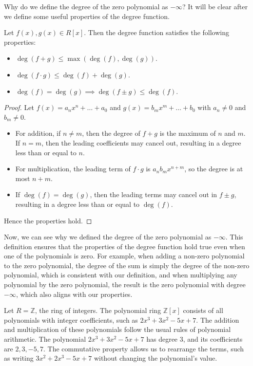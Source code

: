 \documentclass[openany]{book}
\begin{document}
Why do we define the degree of the zero polynomial as $-\infty$? It will be clear after we define some useful properties of the degree function.
\begin{mytheorem}
\cite{2Poly}
Let $f(x), g(x) \in R[x]$. Then the degree function satisfies the following properties:
\begin{itemize}
    \item $\deg(f + g) \leq \max(\deg(f), \deg(g))$.
    \item $\deg(f \cdot g) \leq \deg(f) + \deg(g)$.
    \item $\deg(f) = \deg(g) \implies \deg(f \pm g) \leq \deg(f)$.
\end{itemize}
\end{mytheorem}
\begin{proof}
Let $f(x) = a_n x^n + \ldots + a_0$ and $g(x) = b_m x^m + \ldots + b_0$ with $a_n \neq 0$ and $b_m \neq 0$.
\begin{itemize}
    \item For addition, if $n \neq m$, then the degree of $f + g$ is the maximum of $n$ and $m$. If $n = m$, then the leading coefficients may cancel out, resulting in a degree less than or equal to $n$.
    \item For multiplication, the leading term of $f \cdot g$ is $a_n b_m x^{n+m}$, so the degree is at most $n + m$.
    \item If $\deg(f) = \deg(g)$, then the leading terms may cancel out in $f \pm g$, resulting in a degree less than or equal to $\deg(f)$.
\end{itemize}
Hence the properties hold.
\end{proof}
Now, we can see why we defined the degree of the zero polynomial as $-\infty$. This definition ensures that the properties of the degree function hold true even when one of the polynomials is zero. For example, when adding a non-zero polynomial to the zero polynomial, the degree of the sum is simply the degree of the non-zero polynomial, which is consistent with our definition, and when multiplying any polynomial by the zero polynomial, the result is the zero polynomial with degree $-\infty$, which also aligns with our properties. \\
\begin{example}
Let $R = \mathbb{Z}$, the ring of integers. The polynomial ring $\mathbb{Z}[x]$ consists of all polynomials with integer coefficients, such as $2x^3 + 3x^2 - 5x + 7$. The addition and multiplication of these polynomials follow the usual rules of polynomial arithmetic. The polynomial $2x^3 + 3x^2 - 5x + 7$ has degree 3, and its coefficients are $2, 3, -5, 7$. The commutative property allows us to rearrange the terms, such as writing $3x^2 + 2x^3 - 5x + 7$ without changing the polynomial's value.
\end{example}
\end{document}
